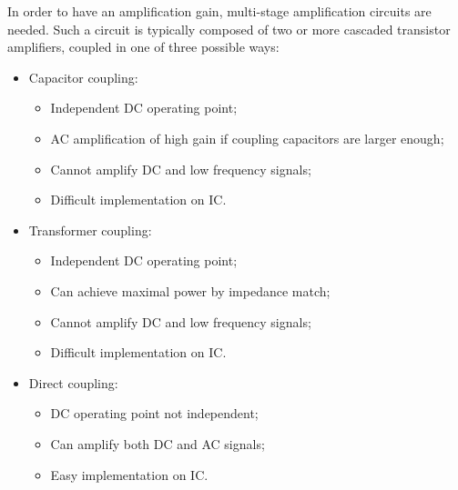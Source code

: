 In order to have an amplification gain, multi-stage amplification circuits
are needed. Such a circuit is typically composed of two or more cascaded
transistor amplifiers, coupled in one of three possible ways:
\begin{itemize}
\item Capacitor coupling:
	\begin{itemize}
	\item Independent DC operating point;
	\item AC amplification of high gain if coupling capacitors are
		larger enough;
	\item Cannot amplify DC and low frequency signals;
	\item Difficult implementation on IC.
	\end{itemize}

\item Transformer coupling:
	\begin{itemize}
	\item Independent DC operating point;
	\item Can achieve maximal power by impedance match;
	\item Cannot amplify DC and low frequency signals;
	\item Difficult implementation on IC.
	\end{itemize}

\item Direct coupling:
	\begin{itemize}
	\item DC operating point not independent;
	\item Can amplify both DC and AC signals;
	\item Easy implementation on IC.
	\end{itemize}

\end{itemize}








	

	












